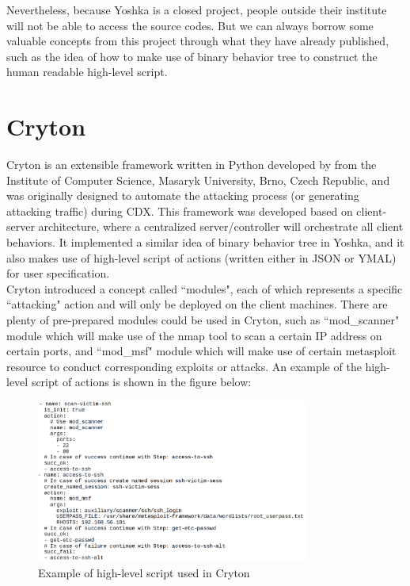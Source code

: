 \documentclass[12pt]{report}
\begin{document}
Nevertheless, because Yoshka is a closed project, people outside their institute will not be able to access the source codes. But we can always borrow some valuable concepts from this project through what they have already published, such as the idea of how to make use of binary behavior tree to construct the human readable high-level script. 


\section{Cryton}

Cryton is an extensible framework written in Python developed by \citet{Cryton} from the Institute of Computer Science, Masaryk University, Brno, Czech Republic, and was originally designed to automate the attacking process (or generating attacking traffic) during CDX. This framework was developed based on client-server architecture, where a centralized server/controller will orchestrate all client behaviors. It implemented a similar idea of binary behavior tree in Yoshka, and it also makes use of high-level script of actions (written either in JSON or YMAL) for user specification.\\

Cryton introduced a concept called ``modules", each of which represents a specific ``attacking" action and will only be deployed on the client machines. There are plenty of pre-prepared modules could be used in Cryton, such as ``mod\_scanner" module which will make use of the nmap tool to scan a certain IP address on certain ports, and ``mod\_msf" module which will make use of certain metasploit resource to conduct corresponding exploits or attacks. An example of the high-level script of actions is shown in the figure below:

\begin{figure}[h!]
	\centering
	\includegraphics[width=0.8\textwidth]{./pictures/cryton-hls}
	\caption{Example of high-level script used in Cryton}
\end{figure}
\end{document}
